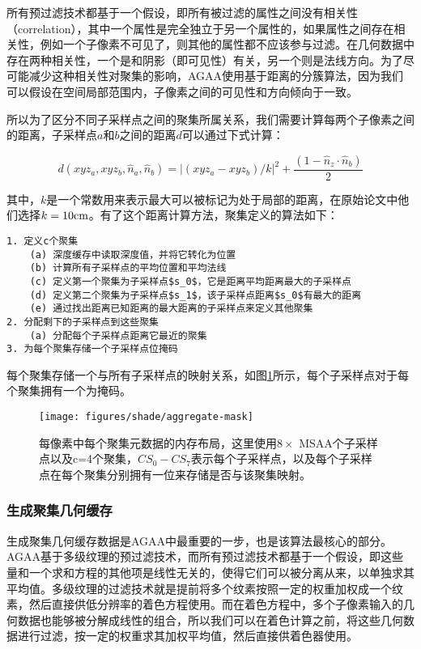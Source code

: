 所有预过滤技术都基于一个假设，即所有被过滤的属性之间没有相关性（correlation），其中一个属性是完全独立于另一个属性的，如果属性之间存在相关性，例如一个子像素不可见了，则其他的属性都不应该参与过滤。在几何数据中存在两种相关性，一个是和阴影（即可见性）有关，另一个则是法线方向。为了尽可能减少这种相关性对聚集的影响，AGAA使用基于距离的分簇算法，因为我们可以假设在空间局部范围内，子像素之间的可见性和方向倾向于一致。

所以为了区分不同子采样点之间的聚集所属关系，我们需要计算每两个子像素之间的距离，子采样点$a$和$b$之间的距离$d$可以通过下式计算：

\begin{equation}
	d(xyz_a,xyz_b,\hat{n}_a,\hat{n}_b)=|(xyz_a-xyz_b)/k|^{2}+\frac{(1-\hat{n}_z\cdot\hat{n}_b)}{2}
\end{equation}

其中，$k$是一个常数用来表示最大可以被标记为处于局部的距离，在原始论文中他们选择$k=10{\rm cm}$。有了这个距离计算方法，聚集定义的算法如下：

\begin{lstlisting}[mathescape=true]
1. 定义c个聚集
	(a) 深度缓存中读取深度值，并将它转化为位置
	(b) 计算所有子采样点的平均位置和平均法线
	(c) 定义第一个聚集为子采样点$s_0$，它是距离平均距离最大的子采样点
	(d) 定义第二个聚集为子采样点$s_1$，该子采样点距离$s_0$有最大的距离
	(e) 通过找出距离已知距离的最大距离的子采样点来定义其他聚集
2. 分配剩下的子采样点到这些聚集
	(a) 分配每个子采样点距离它最近的聚集
3. 为每个聚集存储一个子采样点位掩码
\end{lstlisting}

每个聚集存储一个与所有子采样点的映射关系，如图\ref{f:shade-aggregate-mask}所示，每个子采样点对于每个聚集拥有一个为掩码。

\begin{figure}
	\texttt{[image: figures/shade/aggregate-mask]}
	\caption{每像素中每个聚集元数据的内存布局，这里使用$8\times$ MSAA个子采样点以及c=4个聚集，$CS_0-CS_7$表示每个子采样点，以及每个子采样点在每个聚集分别拥有一位来存储是否与该聚集映射。}
	\label{f:shade-aggregate-mask}
\end{figure}




\subsubsection{生成聚集几何缓存}
生成聚集几何缓存数据是AGAA中最重要的一步，也是该算法最核心的部分。AGAA基于多级纹理的预过滤技术，而所有预过滤技术都基于一个假设，即这些量和一个求和方程的其他项是线性无关的，使得它们可以被分离从来，以单独求其平均值。多级纹理的过滤技术就是提前将多个纹素按照一定的权重加权成一个纹素，然后直接供低分辨率的着色方程使用。而在着色方程中，多个子像素输入的几何数据也能够被分解成线性的组合，所以我们可以在着色计算之前，将这些几何数据进行过滤，按一定的权重求其加权平均值，然后直接供着色器使用。

